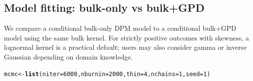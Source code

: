 \documentclass[article]{jss}\usepackage[]{graphicx}\usepackage[]{xcolor}
\makeatletter
\newcommand{\hlnum}[1]{\textcolor[rgb]{0.686,0.059,0.569}{#1}}%
\newcommand{\hldef}[1]{\textcolor[rgb]{0.345,0.345,0.345}{#1}}%
\newcommand{\hlkwb}[1]{\textcolor[rgb]{0.69,0.353,0.396}{#1}}%
\newcommand{\hlkwc}[1]{\textcolor[rgb]{0.333,0.667,0.333}{#1}}%
\newcommand{\hlkwd}[1]{\textcolor[rgb]{0.737,0.353,0.396}{\textbf{#1}}}%
\newenvironment{kframe}{%
 \def\at@end@of@kframe{}%
 \ifinner\ifhmode%
  \def\at@end@of@kframe{\end{minipage}}%
  \begin{minipage}{\columnwidth}%
 \fi\fi%
 \def\FrameCommand##1{\hskip\@totalleftmargin \hskip-\fboxsep
 \colorbox{shadecolor}{##1}\hskip-\fboxsep
     \hskip-\linewidth \hskip-\@totalleftmargin \hskip\columnwidth}%
 \MakeFramed {\advance\hsize-\width
   \@totalleftmargin\z@ \linewidth\hsize
   \@setminipage}}%
 {\par\unskip\endMakeFramed%
 \at@end@of@kframe}
\newenvironment{knitrout}{}{} %
\makeatother
\begin{document}
\subsection{Model fitting: bulk-only vs bulk+GPD}

We compare a conditional bulk-only DPM model to a conditional bulk+GPD model using the same bulk kernel.
For strictly positive outcomes with skewness, a lognormal kernel is a practical default;
users may also consider gamma or inverse Gaussian depending on domain knowledge.

\begin{knitrout}
\color{fgcolor}\begin{kframe}
\begin{alltt}
\hldef{mcmc} \hlkwb{<-} \hlkwd{list}\hldef{(}\hlkwc{niter} \hldef{=} \hlnum{6000}\hldef{,} \hlkwc{nburnin} \hldef{=} \hlnum{2000}\hldef{,} \hlkwc{thin} \hldef{=} \hlnum{4}\hldef{,} \hlkwc{nchains} \hldef{=} \hlnum{1}\hldef{,} \hlkwc{seed} \hldef{=} \hlnum{1}\hldef{)}


\end{alltt}
\end{kframe}
\end{knitrout}
\end{document}
